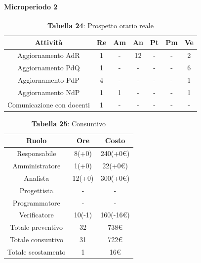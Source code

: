 \paragraph{Microperiodo 2}
\begin{table}[H]
	\centering
	\begin{tabular}{|c|c|c|c|c|c|c|}
		\hline
		\rowcolor{lighter-grayer}
		\textbf{Attività} & \textbf{Re}        & \textbf{Am}        & \textbf{An}        & \textbf{Pt}        & \textbf{Pm}        & \textbf{Ve}        \\ \hline
		
		Aggiornamento AdR & 1 & - & 12 & - & - & 2 \\ \hline
		Aggiornamento PdQ & 1 & - & - & - & - & 6 \\ \hline
		Aggiornamento PdP & 4 & - & - & - & - & 1 \\ \hline
		Aggiornamento NdP & 1 & 1 & - & - & - & 1 \\ \hline
		Comunicazione con docenti & 1 & - & - & - & - & - \\ \hline
		
	\end{tabular}
	\caption*{\textbf{Tabella 24}: Prospetto orario reale\\}
\end{table}

\begin{table}[H]
	\centering
	\renewcommand{\arraystretch}{1.5}
	\begin{tabular}{|c|c|c|}
		\hline
		\rowcolor{lighter-grayer}
		Ruolo & Ore & Costo \\ \hline
		Responsabile & 8(+0) & 240(+0\euro) \\ \hline
		Amministratore & 1(+0) & 22(+0\euro) \\ \hline
		Analista & 12(+0) & 300(+0\euro) \\ \hline
		Progettista & - & - \\ \hline
		Programmatore & - & - \\ \hline
		Verificatore & 10(-1) & 160(-16\euro) \\ \hline
		Totale preventivo & 32 & 738\euro \\ \hline
		Totale consuntivo & 31 & 722\euro \\ \hline
		Totale scostamento & 1 & 16\euro \\ \hline
	\end{tabular}
	\caption*{\textbf{Tabella 25}: Consuntivo\\}
\end{table}


